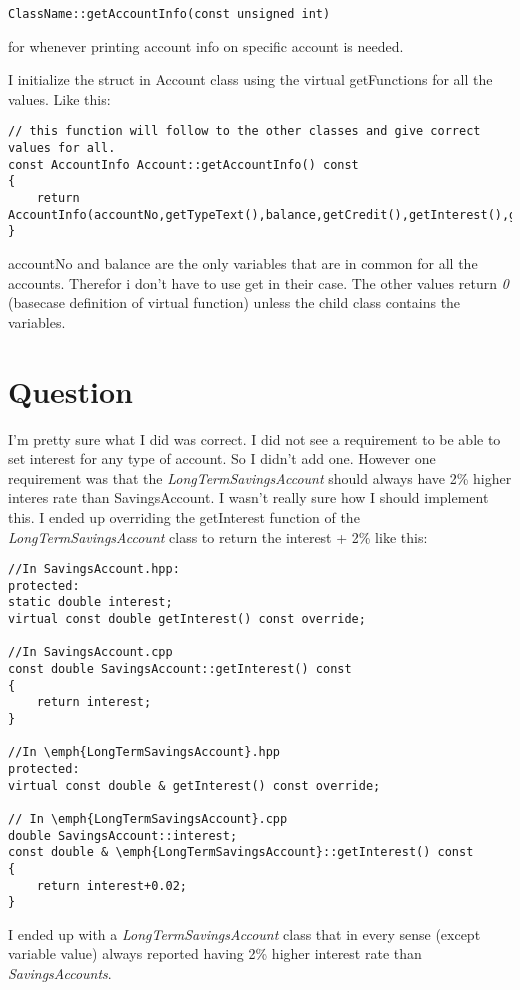 \documentclass[11pt]{article}
\begin{document}
\begin{lstlisting}
ClassName::getAccountInfo(const unsigned int)
\end{lstlisting}
for whenever printing account info on specific account is needed.


I initialize the struct in Account class using the virtual getFunctions for all the values. Like this:

\begin{lstlisting}
// this function will follow to the other classes and give correct values for all.
const AccountInfo Account::getAccountInfo() const 
{
	return AccountInfo(accountNo,getTypeText(),balance,getCredit(),getInterest(),getUsableBalance());
} 	
\end{lstlisting}
accountNo and balance are the only variables that are in common for all the accounts. Therefor i don't have to use get in their case. The other values return \emph{0} (basecase definition of virtual function) unless the child class contains the variables.

\section{Question}

I'm pretty sure what I did was correct. I did not see a requirement to be able to set interest for any type of account. So I didn't add one. However one requirement was that the \emph{LongTermSavingsAccount} should always have 2\% higher interes rate than SavingsAccount. I wasn't really sure how I should implement this. I ended up overriding the getInterest function of the \emph{LongTermSavingsAccount} class to return the interest + 2\% like this:
\begin{lstlisting}
//In SavingsAccount.hpp:
protected:
static double interest;
virtual const double getInterest() const override;

//In SavingsAccount.cpp
const double SavingsAccount::getInterest() const
{
	return interest;
}

//In \emph{LongTermSavingsAccount}.hpp
protected:
virtual const double & getInterest() const override;

// In \emph{LongTermSavingsAccount}.cpp
double SavingsAccount::interest;
const double & \emph{LongTermSavingsAccount}::getInterest() const
{
	return interest+0.02;
}
\end{lstlisting}

I ended up with a \emph{LongTermSavingsAccount} class that in every sense (except variable value) always reported having 2\% higher interest rate than \emph{SavingsAccounts}.
\end{document}
